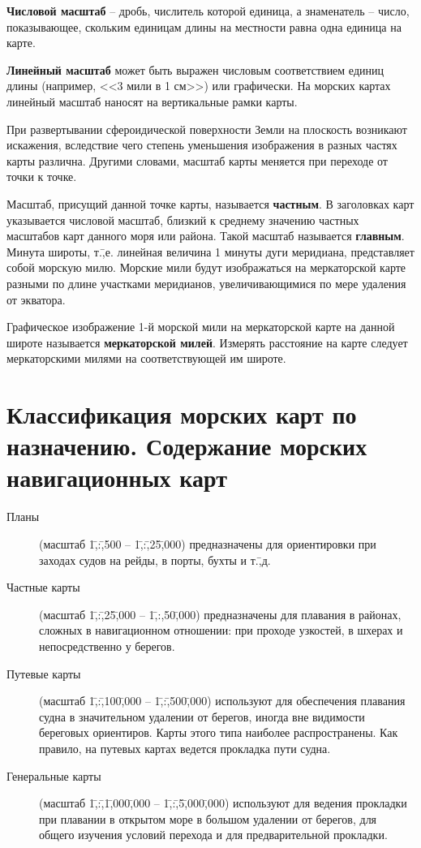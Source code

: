 \textbf{Числовой масштаб} \--- дробь, числитель которой единица, а знаменатель \--- число, показывающее, скольким единицам длины на местности равна одна единица на карте. 

\textbf{Линейный масштаб} может быть выражен числовым соответствием единиц длины (например, <<3 мили в 1 см>>) или графически. На морских картах линейный масштаб наносят на вертикальные рамки карты. 

При развертывании сфероидической поверхности Земли на плоскость возникают искажения, вследствие чего степень уменьшения изображения в разных частях карты различна. Другими словами, масштаб карты меняется при переходе от точки к точке. 

Масштаб, присущий данной точке карты, называется \textbf{частным}. В заголовках карт указывается числовой масштаб, близкий к среднему значению частных масштабов карт данного моря или района. Такой масштаб называется \textbf{главным}. Минута широты, т.\=,е. линейная величина 1 минуты дуги меридиана, представляет собой морскую милю. Морские мили будут изображаться на меркаторской карте разными по длине участками меридианов, увеличивающимися по мере удаления от экватора.

 Графическое изображение 1-й морской мили на меркаторской карте на данной широте называется \textbf{меркаторской милей}. Измерять расстояние на карте следует меркаторскими милями на соответствующей им широте. 

\section{Классификация морских карт по назначению. Содержание морских навигационных карт}

\begin{description} 
\item [Планы] (масштаб 1\=,:\=,500 \--- 1\=,:\=,25\=,000) предназначены для ориентировки при заходах судов на рейды, в порты, бухты и т.\=,д. 
\item [Частные карты] (масштаб 1\=,:\=,25\=,000 \--- 1\=,:\-,50\=,000) предназначены для плавания в районах, сложных в навигационном отношении: при проходе узкостей, в шхерах и непосредственно у берегов. 
\item [Путевые карты] (масштаб 1\=,:\=,100\=,000 \--- 1\=,:\=,500\=,000) используют для обеспечения плавания судна в значительном удалении от берегов, иногда вне видимости береговых ориентиров. Карты этого типа наиболее распространены. Как правило, на путевых картах ведется прокладка пути судна. 
\item [Генеральные карты] (масштаб 1\=,:\=,1\=,000\=,000 \--- 1\=,:\=,5\=,000\=,000) используют для ведения прокладки при плавании в открытом море в большом удалении от берегов, для общего изучения условий перехода и для предварительной прокладки. 
\end{description}

